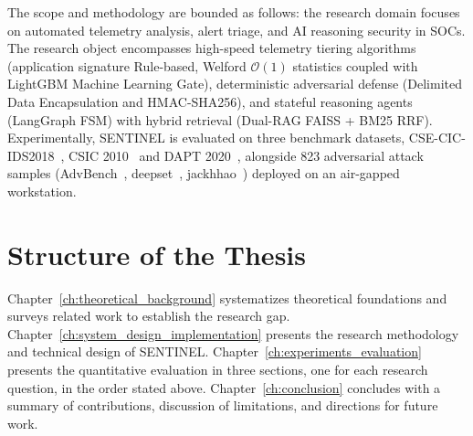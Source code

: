 The scope and methodology are bounded as follows: the research domain focuses on automated telemetry analysis, alert triage, and AI reasoning security in SOCs. The research object encompasses high-speed telemetry tiering algorithms (application signature Rule-based, Welford $\mathcal{O}(1)$ statistics coupled with LightGBM Machine Learning Gate), deterministic adversarial defense (Delimited Data Encapsulation and HMAC-SHA256), and stateful reasoning agents (LangGraph FSM) with hybrid retrieval (Dual-RAG FAISS + BM25 RRF). Experimentally, SENTINEL is evaluated on three benchmark datasets, CSE-CIC-IDS2018~\cite{ids2018}, CSIC 2010~\cite{csic2010} and DAPT 2020~\cite{dapt2020}, alongside 823 adversarial attack samples (AdvBench~\cite{advbench2023}, deepset~\cite{deepset2023}, jackhhao~\cite{jackhhao2023}) deployed on an air-gapped workstation.

\section{Structure of the Thesis}

Chapter~\ref{ch:theoretical_background} systematizes theoretical foundations and surveys related work to establish the research gap. Chapter~\ref{ch:system_design_implementation} presents the research methodology and technical design of SENTINEL. Chapter~\ref{ch:experiments_evaluation} presents the quantitative evaluation in three sections, one for each research question, in the order stated above. Chapter~\ref{ch:conclusion} concludes with a summary of contributions, discussion of limitations, and directions for future work.

